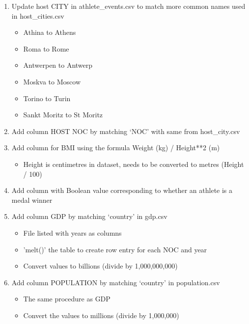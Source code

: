 \documentclass[a4 paper, 12pt]{article}
\begin{document}
\begin{enumerate}
            \item Update host CITY in athlete\_events.csv to match more common names used in host\_cities.csv
                \begin{itemize}
                    \item Athina to Athens
                    \item Roma to Rome 
                    \item Antwerpen to Antwerp
                    \item Moskva to Moscow
                    \item Torino to Turin
                    \item Sankt Moritz to St Moritz
                \end{itemize}                 
            \item Add column HOST NOC by matching ‘NOC’ with same from host\_city.csv
            \item Add column for BMI using the formula Weight (kg) / Height**2 (m) 
               \begin{itemize}
                    \item Height is centimetres in dataset, needs to be converted to metres (Height / 100)
                \end{itemize}
            \item Add column with Boolean value corresponding to whether an athlete is a medal winner     
            \item Add column GDP by matching ‘country’ in gdp.csv
                \begin{itemize}
                    \item File listed with years as columns
                    \item 'melt()' the table to create row entry for each NOC and year
                    \item Convert values to billions (divide by 1,000,000,000)
                \end{itemize}
            \item Add column POPULATION by matching ‘country’ in population.csv  
                \begin{itemize}
                    \item The same procedure as GDP
                    \item Convert the values to millions (divide by 1,000,000)
                \end{itemize}
        \end{enumerate}
    
\end{document}
